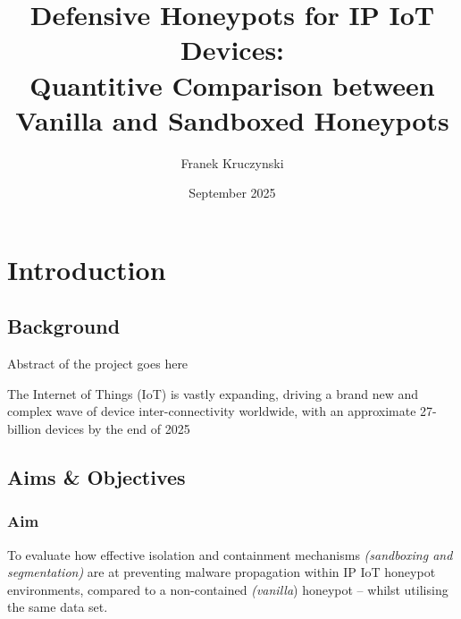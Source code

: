 \documentclass[a4paper,12pt,oneside]{book}			%
\title{\huge\bfseries Defensive Honeypots for IP IoT Devices:\\Quantitive Comparison between Vanilla and Sandboxed Honeypots}
\author{\LARGE Franek Kruczynski}
\date{September 2025}
\begin{document}
\frontmatter			%
\maketitle				%
\setcounter{page}{1}		%
\pagestyle{fancy}

\tableofcontents 			%

\mainmatter 			%
\clearpage			




\chapter{Introduction}\label{ch:intro}		%
\section{Background}\label{sec:background}	%

Abstract of the project goes here

The Internet of Things (IoT) is vastly expanding, driving a brand new and complex wave of device inter-connectivity worldwide, with an approximate 27-billion devices by the end of 2025 \citep{autobits2025iot}

\section{Aims \&{} Objectives}\label{sec:aimAndObjectives}

\subsection{Aim}\label{sec:aim}

To evaluate how effective isolation and containment mechanisms \textit{(sandboxing and segmentation)} are at preventing malware propagation within IP IoT honeypot environments, compared to a non-contained \textit{(vanilla}) honeypot -- whilst utilising the same data set.
\end{document}
